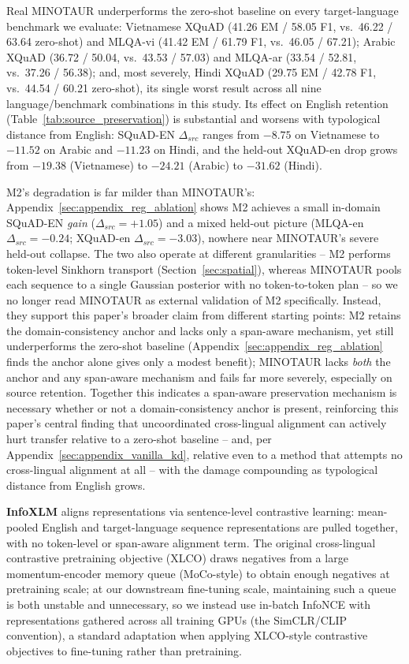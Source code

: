 \documentclass[11pt]{article}
\begin{document}
Real MINOTAUR underperforms the zero-shot baseline on every target-language benchmark we evaluate: Vietnamese XQuAD (41.26 EM / 58.05 F1, vs.\ 46.22 / 63.64 zero-shot) and MLQA-vi (41.42 EM / 61.79 F1, vs.\ 46.05 / 67.21); Arabic XQuAD (36.72 / 50.04, vs.\ 43.53 / 57.03) and MLQA-ar (33.54 / 52.81, vs.\ 37.26 / 56.38); and, most severely, Hindi XQuAD (29.75 EM / 42.78 F1, vs.\ 44.54 / 60.21 zero-shot), its single worst result across all nine language/benchmark combinations in this study. Its effect on English retention (Table~\ref{tab:source_preservation}) is substantial and worsens with typological distance from English: SQuAD-EN $\Delta_{src}$ ranges from $-8.75$ on Vietnamese to $-11.52$ on Arabic and $-11.23$ on Hindi, and the held-out XQuAD-en drop grows from $-19.38$ (Vietnamese) to $-24.21$ (Arabic) to $-31.62$ (Hindi).

M2's degradation is far milder than MINOTAUR's: Appendix~\ref{sec:appendix_reg_ablation} shows M2 achieves a small in-domain SQuAD-EN \emph{gain} ($\Delta_{src}=+1.05$) and a mixed held-out picture (MLQA-en $\Delta_{src}=-0.24$; XQuAD-en $\Delta_{src}=-3.03$), nowhere near MINOTAUR's severe held-out collapse. The two also operate at different granularities -- M2 performs token-level Sinkhorn transport (Section~\ref{sec:spatial}), whereas MINOTAUR pools each sequence to a single Gaussian posterior with no token-to-token plan -- so we no longer read MINOTAUR as external validation of M2 specifically. Instead, they support this paper's broader claim from different starting points: M2 retains the domain-consistency anchor and lacks only a span-aware mechanism, yet still underperforms the zero-shot baseline (Appendix~\ref{sec:appendix_reg_ablation} finds the anchor alone gives only a modest benefit); MINOTAUR lacks \emph{both} the anchor and any span-aware mechanism and fails far more severely, especially on source retention. Together this indicates a span-aware preservation mechanism is necessary whether or not a domain-consistency anchor is present, reinforcing this paper's central finding that uncoordinated cross-lingual alignment can actively hurt transfer relative to a zero-shot baseline -- and, per Appendix~\ref{sec:appendix_vanilla_kd}, relative even to a method that attempts no cross-lingual alignment at all -- with the damage compounding as typological distance from English grows.

\textbf{InfoXLM}
\label{sec:appendix_infoxlm}
\citep{chi-etal-2021-infoxlm} aligns representations via sentence-level contrastive learning: mean-pooled English and target-language sequence representations are pulled together, with no token-level or span-aware alignment term. The original cross-lingual contrastive pretraining objective (XLCO) draws negatives from a large momentum-encoder memory queue (MoCo-style) to obtain enough negatives at pretraining scale; at our downstream fine-tuning scale, maintaining such a queue is both unstable and unnecessary, so we instead use in-batch InfoNCE with representations gathered across all training GPUs (the SimCLR/CLIP convention), a standard adaptation when applying XLCO-style contrastive objectives to fine-tuning rather than pretraining.
\end{document}
